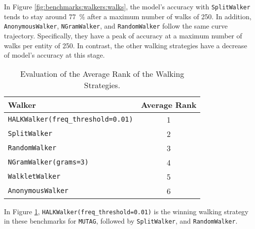 In Figure \ref{fig:benchmarks:walkers:walks}, the model's accuracy with
\texttt{SplitWalker} tends to stay around \SI{77}{\percent} after a maximum
number of walks of 250. In addition, \texttt{AnonymousWalker},
\texttt{NGramWalker}, and \texttt{RandomWalker} follow the same curve
trajectory. Specifically, they have a peak of accuracy at a maximum number of
walks per entity of 250. In contrast, the other walking strategies have a
decrease of model's accuracy at this stage.

\begin{table}[!ht]
  \centering
  \begin{tabular}{lc}
    \toprule
    \textbf{Walker} & \textbf{Average Rank} \\
    \midrule
    \texttt{HALKWalker(freq\_threshold=0.01)} & 1 \\
    \texttt{SplitWalker} & 2 \\
    \texttt{RandomWalker} & 3 \\
    \texttt{NGramWalker(grams=3)} & 4 \\
    \texttt{WalkletWalker} & 5 \\
    \texttt{AnonymousWalker} & 6 \\
    \bottomrule
  \end{tabular}
  \caption{Evaluation of the Average Rank of the Walking Strategies.}
  \label{tab:benchmark:walkers:average:rank}
\end{table}

In Figure \ref{tab:benchmark:walkers:average:rank},
\texttt{HALKWalker(freq\_threshold=0.01)} is the winning walking strategy in
these benchmarks for \texttt{MUTAG}, followed by \texttt{SplitWalker}, and
\texttt{RandomWalker}.

